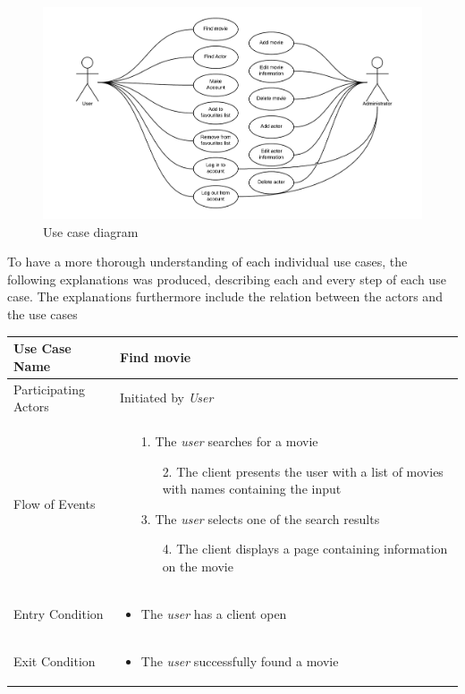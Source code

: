\begin{figure}[H]
\includegraphics[width=\linewidth]{img/usecasediagram.png}
\caption{Use case diagram}
\label{fig:use case diagram}
\end{figure}

To have a more thorough understanding of each individual use cases, the following explanations was produced, describing each and every step of each use case.
The explanations furthermore include the relation between the actors and the use cases


\begin{center}
	\begin{tabular}{ | l | p{10cm} |  }
		 \hline
		Use Case Name & Find movie \\ \hline
		Participating Actors & Initiated by \emph{User} \\ \hline
		Flow of Events & \begin{enumerate}
						\item[1.] The \emph{user} searches for a movie
						\begin{enumerate}
							\item[2.] The client presents the user with a list of movies with names containing the input
						\end{enumerate}
						\item[3.] The \emph{user} selects one of the search results
						\begin{enumerate}
							\item[4.] The client displays a page containing information on the movie
						\end{enumerate}
					\end{enumerate} \\ \hline
		Entry Condition & \begin{itemize}
						\item The \emph{user} has a client open
					\end{itemize} \\ \hline
		Exit Condition & \begin{itemize}
						\item The \emph{user} successfully found a movie
					\end{itemize} \\
		\hline
	\end{tabular}
\end{center}


